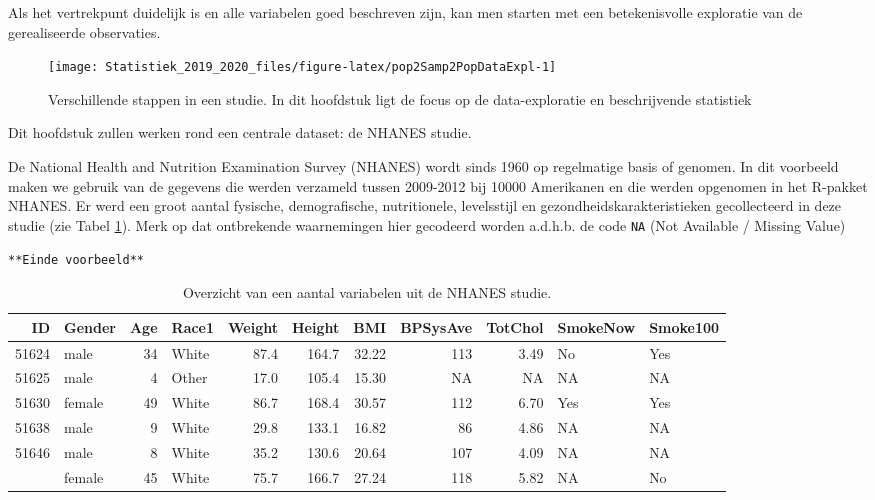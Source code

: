 \documentclass[12pt,dutch,coursenotes]{book}
\theoremstyle{definition}
\theoremstyle{definition}
\theoremstyle{definition}
\theoremstyle{remark}
\let\BeginKnitrBlock\begin \let\EndKnitrBlock\end
\begin{document}
Als het vertrekpunt duidelijk is en alle variabelen goed beschreven
zijn, kan men starten met een betekenisvolle exploratie van de
gerealiseerde observaties.

\begin{figure}

{\centering \texttt{[image: Statistiek\_2019\_2020\_files/figure-latex/pop2Samp2PopDataExpl-1]} 

}

\caption{Verschillende stappen in een studie. In dit hoofdstuk ligt de focus op de data-exploratie en beschrijvende statistiek}\label{fig:pop2Samp2PopDataExpl}
\end{figure}

Dit hoofdstuk zullen werken rond een centrale dataset: de NHANES studie.

\BeginKnitrBlock{example}[NHANES studie]
\protect\hypertarget{exm:nhanesEx}{}{\label{exm:nhanesEx} \iffalse (NHANES
studie) \fi{} }
\EndKnitrBlock{example}

De National Health and Nutrition Examination Survey (NHANES) wordt sinds
1960 op regelmatige basis of genomen. In dit voorbeeld maken we gebruik
van de gegevens die werden verzameld tussen 2009-2012 bij 10000
Amerikanen en die werden opgenomen in het R-pakket NHANES. Er werd een
groot aantal fysische, demografische, nutritionele, levelsstijl en
gezondheidskarakteristieken gecollecteerd in deze studie (zie Tabel
\ref{tab:nhanesDatExpl}). Merk op dat ontbrekende waarnemingen hier
gecodeerd worden a.d.h.b. de code \texttt{NA} (Not Available / Missing
Value)

\texttt{**Einde\ voorbeeld**}

\begin{table}[t]

\caption{\label{tab:nhanesDatExpl}Overzicht van een aantal variabelen uit de NHANES studie.}
\centering
\begin{tabular}{rlrlrrrrrll}
\toprule
ID & Gender & Age & Race1 & Weight & Height & BMI & BPSysAve & TotChol & SmokeNow & Smoke100\\
\midrule
51624 & male & 34 & White & 87.4 & 164.7 & 32.22 & 113 & 3.49 & No & Yes\\
51625 & male & 4 & Other & 17.0 & 105.4 & 15.30 & NA & NA & NA & NA\\
51630 & female & 49 & White & 86.7 & 168.4 & 30.57 & 112 & 6.70 & Yes & Yes\\
51638 & male & 9 & White & 29.8 & 133.1 & 16.82 & 86 & 4.86 & NA & NA\\
51646 & male & 8 & White & 35.2 & 130.6 & 20.64 & 107 & 4.09 & NA & NA\\
\addlinespace
51647 & female & 45 & White & 75.7 & 166.7 & 27.24 & 118 & 5.82 & NA & No\\
\bottomrule
\end{tabular}
\end{table}
\end{document}
